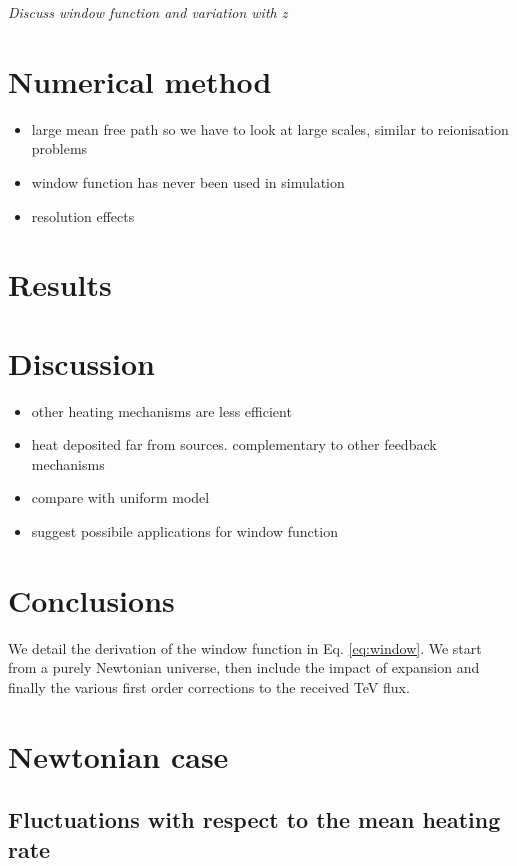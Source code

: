 \documentclass[twocolumns]{emulateapj}
\begin{document}
\textit{Discuss window function and variation with z}


 


\section{Numerical method}
\begin{itemize}

\item large mean free path so we have to look at large scales, similar to reionisation problems
\item window function has never been used in simulation
\item resolution effects
\end{itemize}

\section{Results}

\section{Discussion}
\begin{itemize}
\item other heating mechanisms are less efficient
\item heat deposited far from sources. complementary to other feedback mechanisms
\item compare with uniform model
\item suggest possibile applications for window function
\end{itemize}
\section{Conclusions}

\appendix

We detail the derivation of the window function in Eq. \ref{eq:window}. We start from a purely Newtonian universe, then include the impact of expansion and finally the various first order corrections to the received TeV flux.
\section {Newtonian case}\label{sec:windon_newt}

\subsection {Fluctuations with respect to the mean heating rate}
\end{document}
